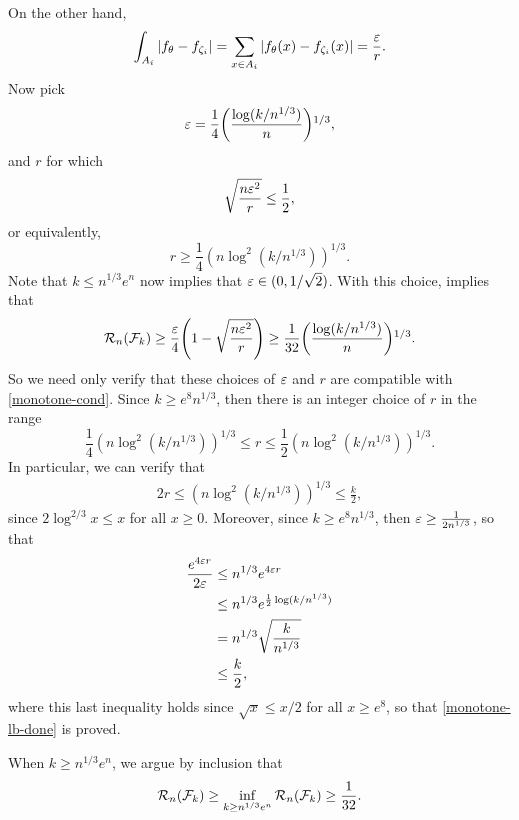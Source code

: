 On the other hand,
\[
  \int_{A_i} |f_\theta - f_{\zeta_i}| = \sum_{x \in A_i} |f_\theta(x) - f_{\zeta_i}(x)| = \frac{\varepsilon}{r} .
\]
Now pick
\[
  \eps = \frac{1}{4} \left(\frac{\log(k/n^{1/3})}{n}\right)^{1/3} ,
\]
and $r$ for which
\[
  \sqrt{\frac{n \varepsilon^2}{r}} \le \frac{1}{2} ,
\]
or equivalently,
\[
  r \ge \frac{1}{4} \left(n \log^2(k/n^{1/3})\right)^{1/3} .
\]
Note that $k \le n^{1/3} e^n$ now implies that
$\varepsilon \in (0, 1/\sqrt{2})$. With this choice,  implies
that
\begin{equation}
  \sR_n(\sF_k) \ge \frac{\eps}{4} \left(1 - \sqrt{\frac{n \eps^2}{r}} \right) \ge \frac{1}{32} \left( \frac{\log (k/n^{1/3})}{n} \right)^{1/3} . \eqlabel{monotone-lb-done}
\end{equation}
So we need only verify that these choices of $\varepsilon$ and $r$ are
compatible with \eqref{monotone-cond}. Since $k \ge e^8 n^{1/3}$, then
there is an integer choice of $r$ in the range
\[
  \frac{1}{4} \left(n \log^2 (k/n^{1/3})\right)^{1/3} \le r \le \frac{1}{2} \left(n \log^2 (k/n^{1/3})\right)^{1/3} .
\]
In particular, we can verify that
\begin{align*}
  2r \le \left(n \log^2 (k/n^{1/3})\right)^{1/3} \le \frac{k}{2} ,
\end{align*}
since $2 \log^{2/3} x \le x$ for all $x \ge 0$. Moreover, since
$k \ge e^8 n^{1/3}$, then $\varepsilon \ge \frac{1}{2 n^{1/3}}$, so that
\begin{align*}
  \frac{e^{4 \eps r}}{2 \eps} &\le n^{1/3} e^{4 \eps r} \\
                              &\le n^{1/3} e^{\frac{1}{2} \log (k/n^{1/3})} \\
                              &= n^{1/3} \sqrt{\frac{k}{n^{1/3}}} \\
                              &\le \frac{k}{2} ,
\end{align*}
where this last inequality holds since $\sqrt{x} \le x/2$ for all
$x \ge e^8$, so that \eqref{monotone-lb-done} is proved.

When $k \ge n^{1/3} e^n$, we argue by inclusion that
\[
  \mathcal{R}_n(\mathcal{F}_k) \ge \inf_{k \ge n^{1/3} e^n} \mathcal{R}_n(\mathcal{F}_k) \ge \frac{1}{32} .
\]

